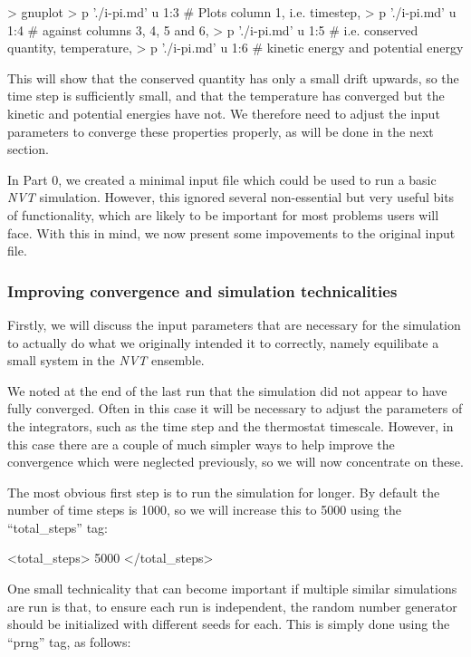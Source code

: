 \documentclass[11pt,english,fleqn]{report}
\newenvironment{code}{%
\footnotesize 
\verbatim
}{
\endverbatim
\normalsize
}
\begin{document}
\begin{code}
> gnuplot
> p './i-pi.md' u 1:3 # Plots column 1, i.e. timestep, 
> p './i-pi.md' u 1:4 # against columns 3, 4, 5 and 6,
> p './i-pi.md' u 1:5 # i.e. conserved quantity, temperature,
> p './i-pi.md' u 1:6 # kinetic energy and potential energy
\end{code}

This will show that the conserved quantity has only a small drift upwards,
so the time step is sufficiently small, and that the temperature has converged
but the kinetic and potential energies have not.
We therefore need to adjust the input parameters to converge these properties
properly, as will be done in the next section.

In Part 0, we created a minimal input file which could be used to
run a basic \emph{NVT} simulation. However, this ignored several non-essential
but very useful bits of functionality, which are likely to be 
important for most problems users will face. With this in mind,
we now present some impovements to the original input file. 

\subsubsection{Improving convergence and simulation technicalities}

Firstly, we will discuss the input parameters that are necessary for
the simulation to actually do what we originally intended it to
correctly, namely equilibate a small system in the \emph{NVT} ensemble.

We noted at the end of the last run that the simulation did not appear to have
fully converged. Often in this case it will be necessary to adjust the parameters
of the integrators, such as the time step and the thermostat timescale.
However, in this case there are a couple of much simpler ways to
help improve the convergence which were neglected previously, so we will now
concentrate on these.

The most obvious first step is to run the simulation for longer. 
By default the number of
time steps is 1000, so we will increase this to 5000 using the 
{}``total\_steps'' tag:

\begin{code}
<total_steps> 5000 </total_steps>
\end{code} 

One small technicality that can become important if multiple similar
simulations are run is that, to ensure each run is independent, the 
random number generator should be initialized with different
seeds for each. This is simply done using the
{}``prng'' tag, as follows:
\end{document}
